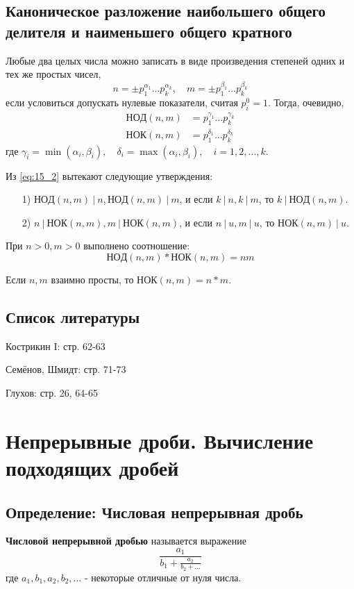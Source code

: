 \documentclass{article}
\newcommand{\cgcd}{\mathrm{НОД}}
\newcommand{\clcm}{\mathrm{НОК}}
\begin{document}
\subsection{Каноническое разложение наибольшего общего делителя и наименьшего общего кратного}
Любые два целых числа можно записать в виде произведения степеней одних и тех же простых чисел,
\[n = \pm p_1^{\alpha_1} \dots p_k^{\alpha_k}, \quad m = \pm p_1^{\beta_1} \dots p_k^{\beta_k}\]
если условиться допускать нулевые показатели, считая $p_i^0 = 1$. Тогда, очевидно,
\begin{equation}
\label{eq:15_2}
\begin{array}{ll}
\cgcd(n, m) &= p_1^{\gamma_1} \dots p_k^{\gamma_k} \\
\clcm(n, m) &= p_1^{\delta_1} \dots p_k^{\delta_k}
\end{array}
\end{equation}
где $\gamma_i = \min(\alpha_i, \beta_i), \quad \delta_i = \max(\alpha_i, \beta_i), \quad i = 1, 2, \dots, k$.

Из \eqref{eq:15_2} вытекают следующие утверждения:
\begin{enumerate}
\item[1)] $\cgcd(n, m)~\vert~n, \cgcd(n, m)~\vert~m$, и если $k~\vert~n, k~\vert~m$, то $k~\vert~\cgcd(n, m)$.
\item[2)] $n~\vert~\clcm(n, m), m~\vert~\clcm(n, m)$, и если $n~\vert~u, m~\vert~u$, то $\clcm(n, m)~\vert~u$.
\end{enumerate}

При $n > 0, m > 0$ выполнено соотношение:
\[\cgcd(n, m) * \clcm(n, m) = nm\]

Если $n, m$ взаимно просты, то $\clcm(n, m) = n * m$.

\subsection*{Список литературы}
Кострикин I: стр. 62-63

Семёнов, Шмидт: стр. 71-73

Глухов: стр. 26, 64-65



\newpage
\section{Непрерывные дроби. Вычисление подходящих дробей}
\subsection{Определение: Числовая непрерывная дробь}
\textbf{Числовой непрерывной дробью} называется выражение
\begin{equation}
\label{eq:16_1}
\frac{a_1}{b_1 + \frac{a_2}{b_2 + \dots}}
\end{equation}
где $a_1, b_1, a_2, b_2, \dots$ - некоторые отличные от нуля числа.
\end{document}
